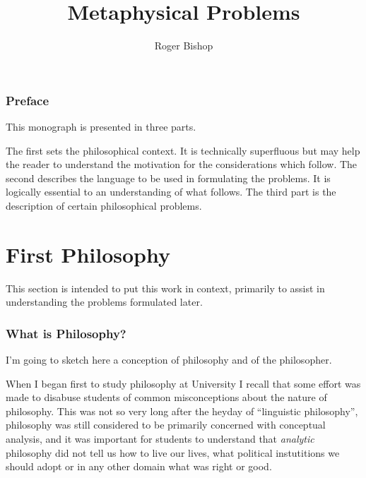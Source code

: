 \documentclass{rbjk}
\begin{document}
                                                                                   
\begin{article}
\begin{opening}  
\title{Metaphysical Problems}
\author{Roger Bishop }

\begin{abstract}
\end{abstract}
\end{opening}

\setcounter{tocdepth}{4}
{\parskip-0pt\tableofcontents}

\section{Preface}

This monograph is presented in three parts.

The first sets the philosophical context.
It is technically superfluous but may help the reader to understand the motivation for the considerations which follow.
The second describes the language to be used in formulating the problems.
It is logically essential to an understanding of what follows.
The third part is the description of certain philosophical problems.

\part{First Philosophy}

This section is intended to put this work in context, primarily to assist in understanding the problems formulated later.

\section{What is Philosophy?}

I'm going to sketch here a conception of philosophy and of the philosopher.

When I began first to study philosophy at University I recall that some effort was made to disabuse students of common misconceptions about the nature of philosophy.
This was not so very long after the heyday of ``linguistic philosophy'', philosophy was still considered to be primarily concerned with conceptual analysis, and it was important for students to understand that {\it analytic} philosophy did not tell us how to live our lives, what political instutitions we should adopt or in any other domain what was right or good.


\end{article}
\end{document}
